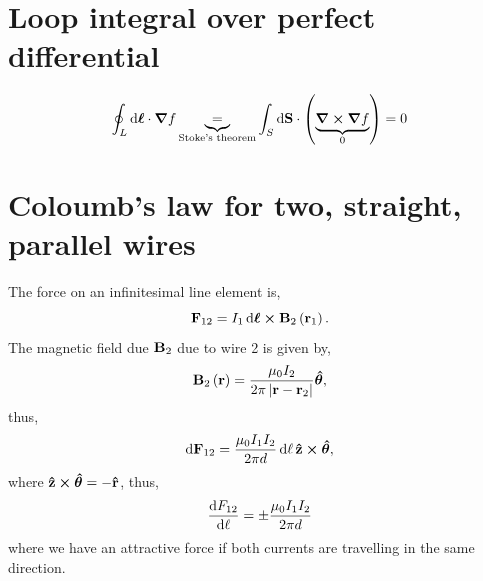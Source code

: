 \documentclass{book}
\begin{document}
\section{Loop integral over perfect differential}

	\begin{equation}
		\oint_L \dd{\vb*{\ell}} \cdot \grad f \underbrace{=}_{\text{Stoke's theorem}} \int_S \dd{\vb{S}} \cdot\left(\underbrace{\curl{\grad f}}_0\right) = 0
	\end{equation}
\section{Coloumb's law for two, straight, parallel wires}
The force on an infinitesimal line element is,
\begin{equation}
	\vb{F}_{12} = I_1\dd{\vb*{\ell}}\cross\vb{B}_2\left(\vb{r}_1\right).
\end{equation}
The magnetic field due $\vb{B}_2$ due to wire 2 is given by,
\begin{equation}
	\vb{B}_2\left(\vb{r}\right) = \frac{\mu_0 I_2}{2\pi\left|\vb{r} - \vb{r}_2\right|}\vu*{\theta},
\end{equation}
thus,
\begin{equation}
	\dd{\vb{F}_{12}} = \frac{\mu_0 I_1I_2}{2\pi d}\dd{\ell}\vu{z}\cross\vu*{\theta},
\end{equation}
where $\vu{z}\cross\vu*{\theta} = - \vu{r}$, thus,
\begin{equation}
	\dv{F_{12}}{\ell} = \pm \frac{\mu_0 I_1I_2}{2\pi d}
\end{equation}
where we have an attractive force if both currents are travelling in the same direction.
\end{document}
